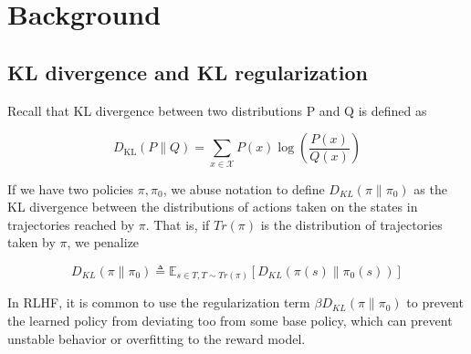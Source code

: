 \documentclass{article}
\begin{document}






\section{Background}

\subsection{KL divergence and KL regularization}

Recall that KL divergence between two distributions P and Q is defined as

$$
D_{\mathrm{KL}}(P \| Q)=\sum_{x \in \mathcal{X}} P(x) \log \left(\frac{P(x)}{Q(x)}\right)
$$

If we have two policies $\pi, \pi_0$, we abuse notation to define $D_{KL}(\pi \| \pi_0)$ as the KL divergence between the distributions of actions taken on the states in trajectories reached by $\pi$. That is, if $Tr(\pi)$ is the distribution of trajectories taken by $\pi$, we penalize

$$
D_{KL}(\pi \| \pi_0) \triangleq \mathbb E_{s \in T, T\sim Tr(\pi)}[D_{KL}(\pi(s) \| \pi_0(s))]
$$

In RLHF, it is common to use the regularization term $\beta D_{KL}\left(\pi \| \pi_0 \right)$ to prevent the learned policy from deviating too from some base policy, which can prevent unstable behavior or overfitting to the reward model.
\end{document}
